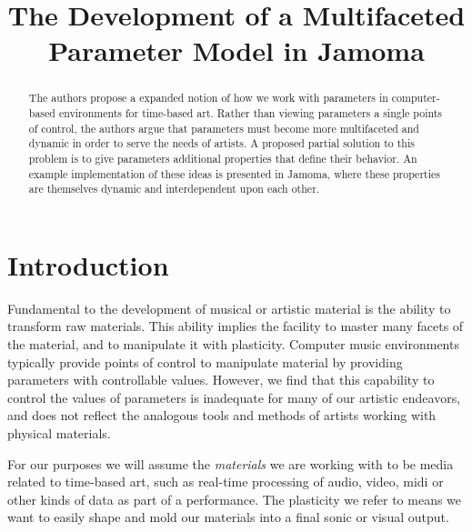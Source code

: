\documentclass{article}
\title{The Development of a Multifaceted Parameter Model in Jamoma}
\begin{document}
%
\maketitle
%
\sloppy
\begin{abstract}
The authors propose a expanded notion of how we work with parameters in computer-based environments for time-based art. Rather than viewing parameters a single points of control, the authors argue that parameters must become more multifaceted and dynamic in order to serve the needs of artists. A proposed partial solution to this problem is to give parameters additional properties that define their behavior. An example implementation of these ideas is presented in Jamoma, where these properties are themselves dynamic and interdependent upon each other.
\end{abstract}


\section{Introduction} %
\label{sec:introduction}

Fundamental to the development of musical or artistic material is the ability to transform raw materials.  This ability implies the facility to master many facets of the material, and to manipulate it with plasticity.  Computer music environments typically provide points of control to manipulate material by providing parameters with controllable values. However, we find that this capability to control the values of parameters is inadequate for many of our artistic endeavors, and does not reflect the analogous tools and methods of artists working with physical materials. 

For our purposes we will assume the \emph{materials} we are working with to be media related to time-based art, such as real-time processing of audio, video, midi or other kinds of data as part of a performance. The plasticity we refer to means we want to easily shape and mold our materials into a final sonic or visual output.
\end{document}
